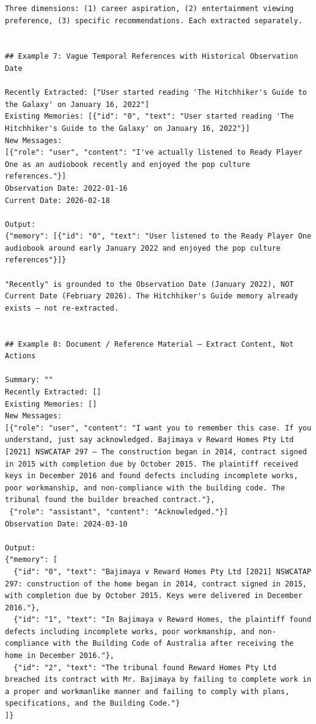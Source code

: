 \documentclass[11pt]{article}
\begin{document}
\begin{lstlisting}
Three dimensions: (1) career aspiration, (2) entertainment viewing preference, (3) specific recommendations. Each extracted separately.


## Example 7: Vague Temporal References with Historical Observation Date

Recently Extracted: ["User started reading 'The Hitchhiker's Guide to the Galaxy' on January 16, 2022"]
Existing Memories: [{"id": "0", "text": "User started reading 'The Hitchhiker's Guide to the Galaxy' on January 16, 2022"}]
New Messages:
[{"role": "user", "content": "I've actually listened to Ready Player One as an audiobook recently and enjoyed the pop culture references."}]
Observation Date: 2022-01-16
Current Date: 2026-02-18

Output:
{"memory": [{"id": "0", "text": "User listened to the Ready Player One audiobook around early January 2022 and enjoyed the pop culture references"}]}

"Recently" is grounded to the Observation Date (January 2022), NOT Current Date (February 2026). The Hitchhiker's Guide memory already exists — not re-extracted.


## Example 8: Document / Reference Material — Extract Content, Not Actions

Summary: ""
Recently Extracted: []
Existing Memories: []
New Messages:
[{"role": "user", "content": "I want you to remember this case. If you understand, just say acknowledged. Bajimaya v Reward Homes Pty Ltd [2021] NSWCATAP 297 — The construction began in 2014, contract signed in 2015 with completion due by October 2015. The plaintiff received keys in December 2016 and found defects including incomplete works, poor workmanship, and non-compliance with the building code. The tribunal found the builder breached contract."},
 {"role": "assistant", "content": "Acknowledged."}]
Observation Date: 2024-03-10

Output:
{"memory": [
  {"id": "0", "text": "Bajimaya v Reward Homes Pty Ltd [2021] NSWCATAP 297: construction of the home began in 2014, contract signed in 2015, with completion due by October 2015. Keys were delivered in December 2016."},
  {"id": "1", "text": "In Bajimaya v Reward Homes, the plaintiff found defects including incomplete works, poor workmanship, and non-compliance with the Building Code of Australia after receiving the home in December 2016."},
  {"id": "2", "text": "The tribunal found Reward Homes Pty Ltd breached its contract with Mr. Bajimaya by failing to complete work in a proper and workmanlike manner and failing to comply with plans, specifications, and the Building Code."}
]}


\end{lstlisting}
\end{document}

